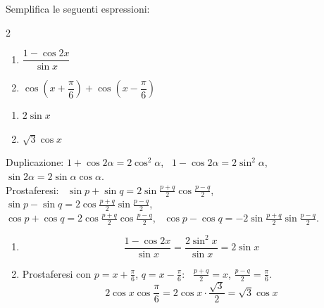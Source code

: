 
\begin{question}[ID=2.2, subtitle={Semplificazione con formule di duplicazione (variante)}, tags={goniometria, formule di duplicazione}, difficulty=facile]
Semplifica le seguenti espressioni:
\begin{multicols}{2}
\begin{enumerate}
\item $\dfrac{1 - \cos 2x}{\sin x}$
\item $\cos\!\left(x + \dfrac{\pi}{6}\right) + \cos\!\left(x - \dfrac{\pi}{6}\right)$
\end{enumerate}
\end{multicols}
\begin{solution}
\begin{enumerate}
    \item $2\sin x$
    \item $\sqrt3\cos x$
\end{enumerate}
\end{solution}
\begin{explanation}
Duplicazione: $1+\cos2\alpha=2\cos^2\alpha$, \ $1-\cos2\alpha=2\sin^2\alpha$, \ $\sin2\alpha=2\sin\alpha\cos\alpha$. \\
Prostaferesi: \ $\sin p+\sin q=2\sin\tfrac{p+q}{2}\cos\tfrac{p-q}{2}$, \ $\sin p-\sin q=2\cos\tfrac{p+q}{2}\sin\tfrac{p-q}{2}$, \\
$\cos p+\cos q=2\cos\tfrac{p+q}{2}\cos\tfrac{p-q}{2}$, \ $\cos p-\cos q=-2\sin\tfrac{p+q}{2}\sin\tfrac{p-q}{2}$.
\begin{enumerate}
    \item \[ \dfrac{1-\cos2x}{\sin x}=\dfrac{2\sin^2x}{\sin x}=2\sin x \]
    \item Prostaferesi con $p=x+\tfrac\pi6$, $q=x-\tfrac\pi6$: \ $\tfrac{p+q}{2}=x$, $\tfrac{p-q}{2}=\tfrac\pi6$.
    \[ 2\cos x\cos\dfrac\pi6=2\cos x\cdot\dfrac{\sqrt3}{2}=\sqrt3\cos x \]
\end{enumerate}
\end{explanation}
\end{question}


